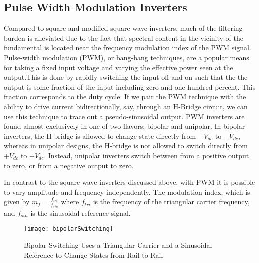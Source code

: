 \subsection{Pulse Width Modulation Inverters}
\label{pwmApproach}
Compared to square and modified square wave inverters, much of the filtering burden is alleviated due to the fact that spectral content in the vicinity of the fundamental is located near the frequency modulation index of the PWM signal. Pulse-width modulation (PWM), or bang-bang techniques, are a popular means for taking a fixed input voltage and varying the effective power seen at the output.This is done by rapidly switching the input off and on such that the the output is some fraction of the input including zero and one hundred percent. This fraction corresponds to the duty cycle. If we pair the PWM technique with the ability to drive current bidirectionally, say, through an H-Bridge circuit, we can use this technique to trace out a pseudo-sinusoidal output. PWM inverters are found almost exclusively in one of two flavors: bipolar and unipolar. In bipolar inverters, the H-bridge is allowed to change state directly from $+V_{dc}$ to $-V_{dc}$, whereas in unipolar designs, the H-bridge is not allowed to switch directly from $+V_{dc}$ to $-V_{dc}$. Instead, unipolar inverters switch between from a positive output to zero, or from a negative output to zero.

In contrast to the square wave inverters discussed above, with PWM it is possible to vary amplitude and frequency independently. The modulation index, which is given by $m_f=\frac{f_{tri}}{f_{sin}}$ where $f_{tri}$ is the frequency of the triangular carrier frequency, and $f_{sin}$ is the sinusoidal reference signal. 

\begin{figure}[h]
\centering
\texttt{[image: bipolarSwitching]}
\caption{Bipolar Switching Uses a Triangular Carrier and a Sinusoidal Reference to Change States from Rail to Rail}
\label{bipolar}
\end{figure}

